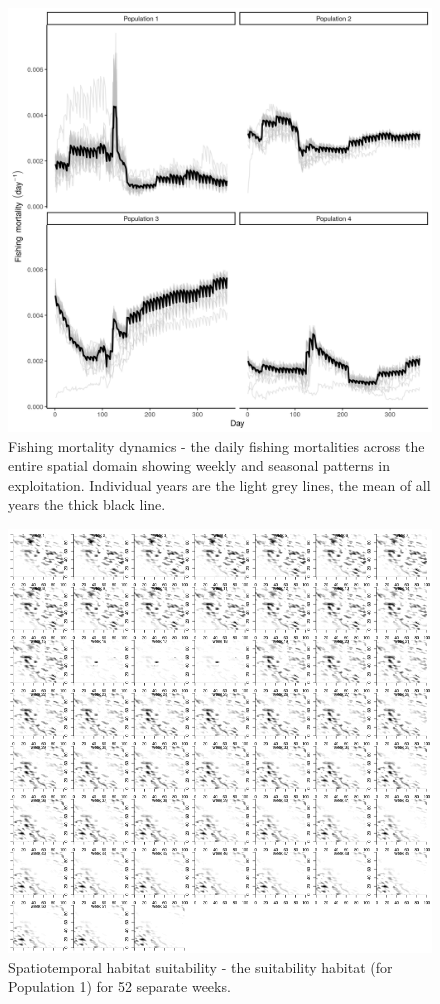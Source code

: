 \documentclass[review]{elsarticle}
\begin{document}
\begin{figure}[!ht]
	\includegraphics[width = \linewidth]{Plots/f_dynamics}
	\caption{Fishing mortality dynamics - the daily fishing mortalities
		across the entire spatial domain showing weekly and seasonal
		patterns in exploitation.  Individual years are the light grey
		lines, the mean of all years the thick black line.}
	\label{fig:10}
\end{figure}	

\begin{figure}[!ht]
	\includegraphics[width = \linewidth]{Plots/habitat_spatiotemp_spp_1}
	\caption{Spatiotemporal habitat suitability - the suitability habitat
		(for Population 1) for 52 separate weeks.}
	\label{fig:5}
\end{figure}
\end{document}
